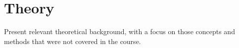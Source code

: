 \section{Theory}
\label{sec:theory}

Present relevant theoretical background, with a focus on those concepts and methods that were not covered in the course.